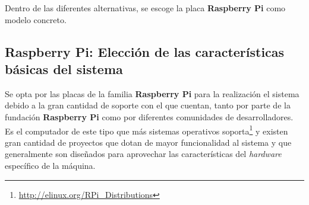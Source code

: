 Dentro de las diferentes alternativas, se escoge la placa \textbf{Raspberry Pi} como modelo concreto.

\subsection{Raspberry Pi: Elección de las características básicas del sistema}

Se opta por las placas de la familia \textbf{Raspberry Pi} para la realización el sistema debido a la gran cantidad de soporte con el que cuentan, tanto por parte de la fundación \textbf{Raspberry Pi} como por diferentes comunidades de desarrolladores. Es el computador de este tipo que más sistemas operativos soporta\footnote{\href{http://elinux.org/RPi_Distributions}{http://elinux.org/RPi\_Distributions}} y existen gran cantidad de proyectos que dotan de mayor funcionalidad al sistema y que generalmente son diseñados para aprovechar las características del \textit{hardware} específico de la máquina.


